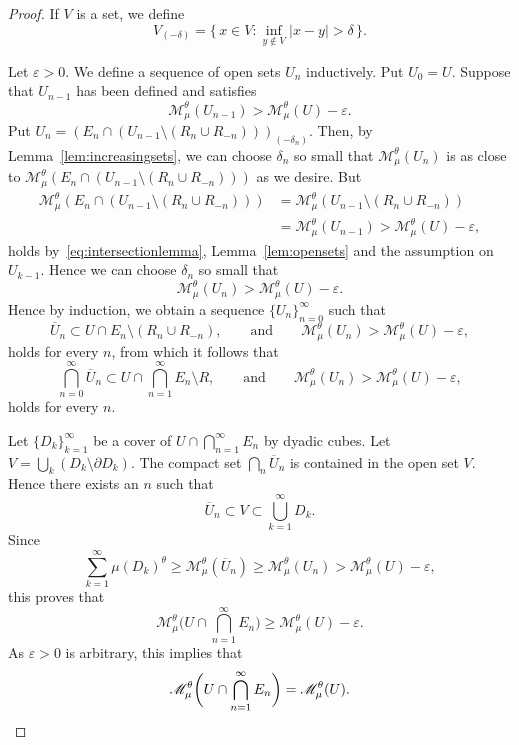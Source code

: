 \documentclass[11pt]{article}
\theoremstyle{definition}
\numberwithin{equation}{section}
\numberwithin{figure}{section}
\numberwithin{table}{section}
\begin{document}
\begin{proof}
If $V$ is a set, we define
\[
V_{(-\delta)} = \{\, x \in V : \inf_{y\not \in V} |x-y| > \delta
\,\}.
\]

Let $\varepsilon > 0$. We define a sequence of open sets $U_n$ inductively. Put $U_0 = U$. Suppose that $U_{n-1}$ has been defined and satisfies
\[
\mathscr{M}_\mu^\theta (U_{n-1}) > \mathscr{M}_\mu^\theta (U) -
\varepsilon.
\]
Put $U_n = (E_n \cap (U_{n-1} \setminus (R_n \cup R_{-n})))_{(-\delta_n)}$. Then, by Lemma~\ref{lem:increasingsets}, we can choose $\delta_n$ so small that $\mathscr{M}_\mu^\theta (U_n)$ is as close to $\mathscr{M}_\mu^\theta (E_n \cap (U_{n-1} \setminus (R_n
\cup R_{-n})))$ as we desire. But
\begin{align*}
\mathscr{M}_\mu^\theta (E_n \cap (U_{n-1} \setminus (R_n \cup R_{-n}))) & = \mathscr{M}_\mu^\theta (U_{n-1} \setminus (R_n \cup R_{-n})) \\ & =\mathscr{M}_\mu^\theta (U_{n-1}) >
\mathscr{M}_\mu^\theta (U) - \varepsilon,
\end{align*}
holds by~\eqref{eq:intersectionlemma}, Lemma~\ref{lem:opensets} and the assumption on $U_{k-1}$. Hence we can choose $\delta_n$ so small that
\[
\mathscr{M}_\mu^\theta (U_n) > \mathscr{M}_\mu^\theta (U) -
\varepsilon.
\]
Hence by induction, we obtain a sequence $\{U_n\}_{n=0}^\infty$ such that
\[
\overline{U}_n \subset U \cap E_n \setminus (R_n \cup R_{-n}),
\qquad \text{and} \qquad \mathscr{M}_\mu^\theta (U_n) >
\mathscr{M}_\mu^\theta (U) - \varepsilon,
\]
holds for every $n$, from which it follows that
\[
\bigcap_{n=0}^\infty \overline{U}_n \subset U \cap
\bigcap_{n=1}^\infty E_n \setminus R, \qquad \text{and} \qquad
\mathscr{M}_\mu^\theta (U_n) > \mathscr{M}_\mu^\theta (U) -
\varepsilon,
\]
holds for every $n$.

Let $\{D_k\}_{k=1}^\infty$ be a cover of $U \cap
\bigcap_{n=1}^\infty E_n$ by dyadic cubes. Let $V = \bigcup_k (D_k
\setminus \partial D_k)$. The compact set $\bigcap_n \overline{U}_n$ is contained in the open set $V$. Hence there exists an $n$ such that
\[
\overline{U}_n \subset V \subset \bigcup_{k = 1}^\infty D_k.
\]
Since
\[
\sum_{k=1}^\infty \mu (D_k)^\theta \geq \mathscr{M}_\mu^\theta (\overline{U}_n) \geq \mathscr{M}_\mu^\theta (U_n) >
\mathscr{M}_\mu^\theta (U) - \varepsilon,
\]
this proves that
\[
\mathscr{M}_\mu^\theta \biggl(U \cap \bigcap_{n=1}^\infty E_n
\biggr) \geq \mathscr{M}_\mu^\theta (U) - \varepsilon.
\]
As $\varepsilon > 0$ is arbitrary, this implies that
\[
\mathscr{M}_\mu^\theta \biggl(U \cap \bigcap_{n=1}^\infty E_n
\biggr) = \mathscr{M}_\mu^\theta (U). \qedhere
\]
\end{proof}
\end{document}
